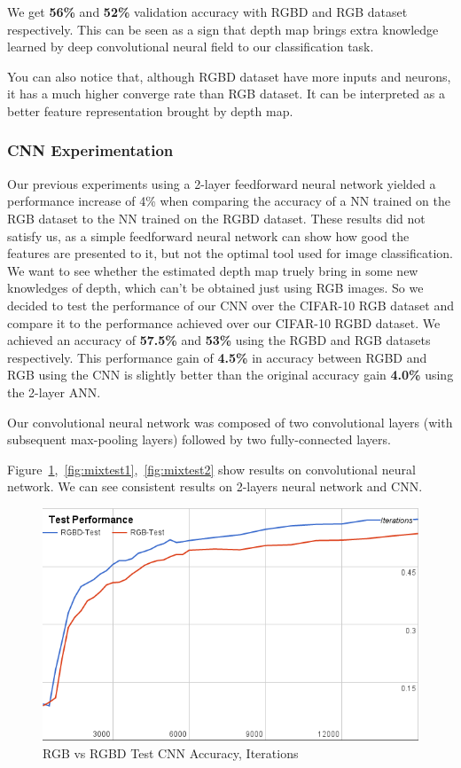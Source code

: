\documentclass[journal]{IEEEtran}
\begin{document}
We get {\bf56\%} and {\bf52\%} validation accuracy with RGBD and RGB dataset respectively.
This can be seen as a sign that depth map brings extra knowledge
learned by deep convolutional neural field to our classification task.

You can also notice that, although RGBD dataset have more inputs and neurons,
it has a much higher converge rate than RGB dataset. 
It can be interpreted as a better feature representation brought by depth map.

\subsubsection{CNN Experimentation}
Our previous experiments using a 2-layer feedforward neural network yielded a performance increase of 4\% when comparing the accuracy of a NN trained on the RGB dataset to the NN trained on the RGBD dataset. These results did not satisfy us, as a simple feedforward neural network can show how good the features are presented to it, but not the optimal tool used for image classification. We want to see whether the estimated depth map truely bring in some new knowledges of depth, which can't be obtained just using RGB images. So we decided to test the performance of our CNN \cite{krizhevsky2012imagenet} over the CIFAR-10 RGB dataset and compare it to the performance achieved over our CIFAR-10 RGBD dataset. We achieved an accuracy of {\bf57.5\%} and {\bf53\%} using the RGBD and RGB datasets respectively. This performance gain of {\bf4.5\%} in accuracy between RGBD and RGB using the CNN is slightly better than the original accuracy gain {\bf4.0\%} using the 2-layer ANN.

Our convolutional neural network was composed of two convolutional layers (with subsequent max-pooling layers) followed by two fully-connected layers. 

Figure~\ref{fig:mixtest0},~\ref{fig:mixtest1},~\ref{fig:mixtest2} show results on convolutional neural network. We can see consistent results on 2-layers neural network and CNN.

\begin{figure}[!t]
	\includegraphics[width=\linewidth]{../presentation/test_conv.png}
	\caption{RGB vs RGBD Test CNN Accuracy, Iterations}
	\label{fig:mixtest0}
\end{figure}
\end{document}
